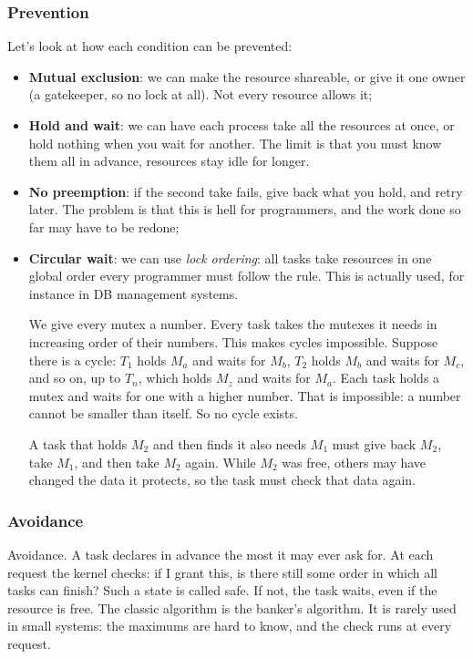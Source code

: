 \documentclass[a4paper,11pt]{article}
\begin{document}
\subsubsection{Prevention}

Let's look at how each condition can be prevented:
\begin{itemize}
	\item \textbf{Mutual exclusion}: we can make the resource shareable, or give it one owner (a gatekeeper, so no lock at all). Not every resource allows it;
	\item \textbf{Hold and wait}: we can have each process take all the resources at once, or hold nothing when you wait for another. The limit is that you must know them all in advance, resources stay idle for longer.
	\item \textbf{No preemption}: if the second take fails, give back what you hold, and retry later. The problem is that this is hell for programmers, and the work done so far may have to be redone;
	\item \textbf{Circular wait}: we can use \textit{lock ordering}: all tasks take resources in one global order every programmer must follow the rule. This is actually used, for instance in DB management systems.

	      We give every mutex a number. Every task takes the mutexes it needs in increasing order of their numbers.
	      This makes cycles impossible.
	      Suppose there is a cycle: $T_1$ holds $M_a$ and waits for $M_b$, $T_2$ holds $M_b$ and waits for $M_c$, and so on, up to $T_n$, which holds $M_z$ and waits for $M_a$.
	      Each task holds a mutex and waits for one with a higher number.
	      That is impossible: a number cannot be smaller than itself. So no cycle exists.

	      A task that holds $M_2$ and then finds it also needs $M_1$ must give back $M_2$, take $M_1$, and then take $M_2$ again. While $M_2$ was free, others may have changed the data it protects, so the task must check that data again.
\end{itemize}

\subsubsection{Avoidance}

Avoidance. A task declares in advance the most it may ever ask for. At each request the kernel checks: if I grant this,
is there still some order in which all tasks can finish? Such a state is called safe. If not, the task waits, even if the
resource is free. The classic algorithm is the banker's algorithm. It is rarely used in small systems: the maximums are
hard to know, and the check runs at every request.
\end{document}
